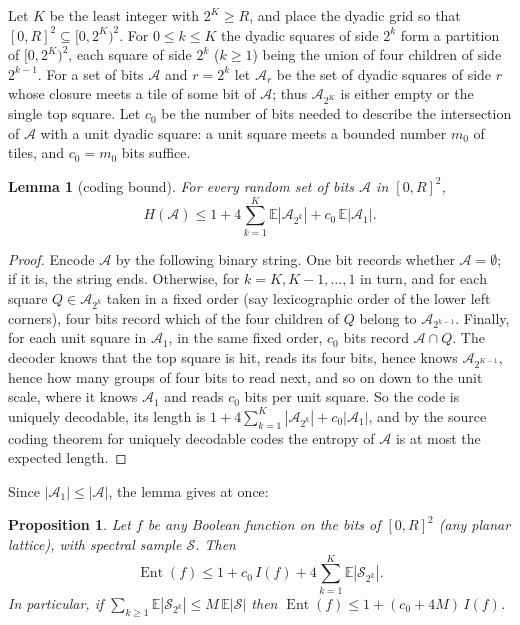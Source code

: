 \documentclass[11pt]{amsart}
\newtheorem{lemma}[theorem]{Lemma}
\newtheorem{proposition}[theorem]{Proposition}
\theoremstyle{remark}
\newcommand{\Ent}{\operatorname{Ent}}
\newcommand{\EE}{\mathbb{E}}
\newcommand{\Sc}{\mathcal{S}}
\begin{document}
Let $K$ be the least integer with $2^K\ge R$, and place the dyadic grid so that $[0,R]^2\subseteq[0,2^K)^2$. For $0\le k\le K$ the dyadic squares of side $2^k$ form a partition of $[0,2^K)^2$, each square of side $2^k$ ($k\ge1$) being the union of four children of side $2^{k-1}$. For a set of bits $\mathcal A$ and $r=2^k$ let $\mathcal A_r$ be the set of dyadic squares of side $r$ whose closure meets a tile of some bit of $\mathcal A$; thus $\mathcal A_{2^K}$ is either empty or the single top square. Let $c_0$ be the number of bits needed to describe the intersection of $\mathcal A$ with a unit dyadic square: a unit square meets a bounded number $m_0$ of tiles, and $c_0=m_0$ bits suffice.

\begin{lemma}[coding bound]\label{lem:coding}
For every random set of bits $\mathcal A$ in $[0,R]^2$,
\[
H(\mathcal A)\le 1+4\sum_{k=1}^{K}\EE|\mathcal A_{2^k}|+c_0\,\EE|\mathcal A_1|.
\]
\end{lemma}

\begin{proof}
Encode $\mathcal A$ by the following binary string. One bit records whether $\mathcal A=\emptyset$; if it is, the string ends. Otherwise, for $k=K,K-1,\dots,1$ in turn, and for each square $Q\in\mathcal A_{2^k}$ taken in a fixed order (say lexicographic order of the lower left corners), four bits record which of the four children of $Q$ belong to $\mathcal A_{2^{k-1}}$. Finally, for each unit square in $\mathcal A_1$, in the same fixed order, $c_0$ bits record $\mathcal A\cap Q$. The decoder knows that the top square is hit, reads its four bits, hence knows $\mathcal A_{2^{K-1}}$, hence how many groups of four bits to read next, and so on down to the unit scale, where it knows $\mathcal A_1$ and reads $c_0$ bits per unit square. So the code is uniquely decodable, its length is $1+4\sum_{k=1}^{K}|\mathcal A_{2^k}|+c_0|\mathcal A_1|$, and by the source coding theorem for uniquely decodable codes \cite[Chapter~5]{CT06} the entropy of $\mathcal A$ is at most the expected length.
\end{proof}

Since $|\mathcal A_1|\le|\mathcal A|$, the lemma gives at once:

\begin{proposition}\label{prop:principle}
Let $f$ be any Boolean function on the bits of $[0,R]^2$ (any planar lattice), with spectral sample $\Sc$. Then
\[
\Ent(f)\le 1+c_0\,I(f)+4\sum_{k=1}^{K}\EE|\Sc_{2^k}|.
\]
In particular, if $\sum_{k\ge1}\EE|\Sc_{2^k}|\le M\,\EE|\Sc|$ then $\Ent(f)\le 1+(c_0+4M)\,I(f)$.
\end{proposition}
\end{document}
